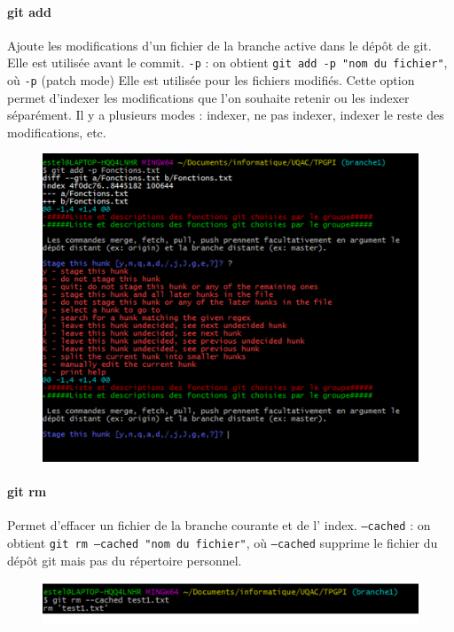 \documentclass[11pt,canadien]{article}
\begin{document}
\paragraph{git add}Ajoute les modifications d’un fichier de la branche active dans le dépôt de git. Elle est utilisée avant le commit. \texttt{-p} : on obtient \texttt{git add -p "nom du fichier"}, où \texttt{-p} (patch mode) Elle est utilisée pour les fichiers modifiés. Cette option permet d’indexer les modifications que l’on souhaite retenir ou les indexer séparément. Il y a plusieurs modes : indexer, ne pas indexer, indexer le reste des modifications, etc.
\begin{figure}[H]
	\centering
	\includegraphics{images/git_add_-p}
\end{figure}

\paragraph{git rm}Permet d’effacer un fichier de la branche courante et de l’ index. \texttt{--cached} : on obtient \texttt{git rm --cached "nom du fichier"}, où \texttt{--cached} supprime le fichier du dépôt git mais pas du répertoire personnel.
\begin{figure}[H]
	\centering
	\includegraphics{images/git_rm_--cached.png}
\end{figure}
\end{document}
